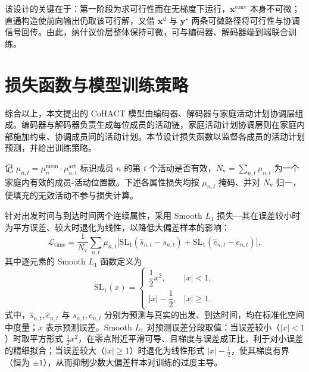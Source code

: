该设计的关键在于：第一阶段为求可行性而在无梯度下运行，$\mathbf{x}^{\mathrm{conv}}$ 本身不可微；直通构造使前向输出仍取该可行解，又借 $\mathbf{x}^{\mathrm{d}}$ 与 $\mathbf{y}^{\star}$ 两条可微路径将可行性与协调信号回传。由此，纳什议价层整体保持可微，可与编码器、解码器端到端联合训练。
 
\section{损失函数与模型训练策略}\label{sec.cohact.loss}

综合以上，本文提出的 CoHACT 模型由编码器、解码器与家庭活动计划协调层组成。编码器与解码器负责生成每位成员的活动链，家庭活动计划协调层则在家庭内部施加约束、协调成员间的活动计划。本节设计损失函数以监督各成员的活动计划预测，并给出训练策略。

记 $\mu_{n,t}=\mu_n^{\mathrm{mem}}\cdot\mu_{n,t}^{\mathrm{act}}$ 标识成员 $n$ 的第 $t$ 个活动是否有效，$N_{\mathrm{v}}=\sum_{n,t}\mu_{n,t}$ 为一个家庭内有效的成员-活动位置数。下述各属性损失均按 $\mu_{n,t}$ 掩码、并对 $N_{\mathrm{v}}$ 归一，使填充的无效活动不参与损失计算。

针对出发时间与到达时间两个连续属性，采用 Smooth $L_1$ 损失—其在误差较小时为平方误差、较大时退化为线性，以降低大偏差样本的影响：
\begin{equation}
\mathcal{L}_{\mathrm{time}}=\frac{1}{N_{\mathrm{v}}}\sum_{n,t}\mu_{n,t}\bigl[\mathrm{SL}_1(\hat{s}_{n,t}-s_{n,t})+\mathrm{SL}_1(\hat{e}_{n,t}-e_{n,t})\bigr],
\label{eq.cohact.losstime}
\end{equation}
其中逐元素的 Smooth $L_1$ 函数定义为
\begin{equation}
\mathrm{SL}_1(x)=
\begin{cases}
\dfrac{1}{2}x^2, & |x|<1,\\[4pt]
|x|-\dfrac{1}{2}, & |x|\ge 1.
\end{cases}
\label{eq.cohact.sl1}
\end{equation}
式中，$\hat{s}_{n,t},\hat{e}_{n,t}$ 与 $s_{n,t},e_{n,t}$ 分别为预测与真实的出发、到达时间，均在标准化空间中度量；$x$ 表示预测误差。Smooth $L_1$ 对预测误差分段取值：当误差较小（$|x|<1$）时取平方形式 $\tfrac{1}{2}x^2$，在零点附近平滑可导、且梯度与误差成正比，利于对小误差的精细拟合；当误差较大（$|x|\ge 1$）时退化为线性形式 $|x|-\tfrac{1}{2}$，使其梯度有界（恒为 $\pm1$），从而抑制少数大偏差样本对训练的过度主导。

